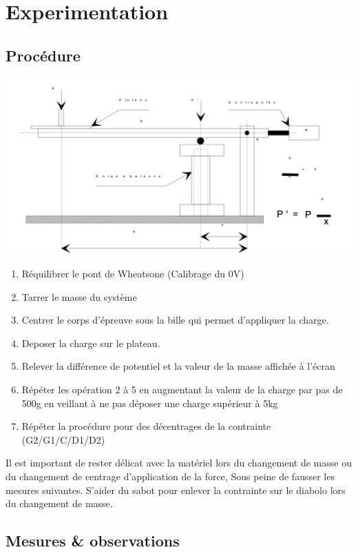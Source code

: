 \documentclass[10pt,a4paper]{report}
\begin{document}
\chapter{Experimentation}

\section{Procédure}
\begin{center}
\includegraphics[scale=0.3]{Montage.jpg}
\end{center}
\begin{enumerate}
\item Réquilibrer le pont de Wheatsone (Calibrage du 0V)
\item Tarrer le masse du système									
\item Centrer le corps d'épreuve sous la bille qui permet d'appliquer la charge.
\item Deposer la charge sur le plateau.
\item Relever la différence de potentiel  et la valeur de la masse affichée à l'écran
\item Répéter les opération 2 à 5 en augmentant la valeur de la charge par pas de 500g en veillant à ne pas déposer une charge supérieur à 5kg
\item Répéter la procédure pour des décentrages de la contrainte (G2/G1/C/D1/D2)
\end{enumerate} 


Il est important de rester délicat avec la matériel lors du changement de masse ou du changement de centrage d'application de la force, Sous peine de fausser les mesures suivantes. S'aider du sabot pour enlever la contrainte sur le diabolo lors du changement de masse.
\newpage
\section{Mesures \& observations}
\end{document}
